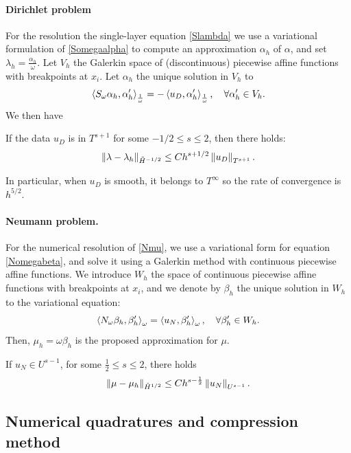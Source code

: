 \documentclass[a4paper]{article}
\begin{document}
\paragraph{Dirichlet problem} For the resolution the single-layer equation \eqref{Slambda} we use a variational formulation of \eqref{Somegaalpha} to compute an approximation $\alpha_h$ of $\alpha$, and set $\lambda_h = \frac{\alpha_h}{\omega}$. Let $V_h$ the Galerkin space of (discontinuous) piecewise affine functions with breakpoints at $x_i$. Let $\alpha_h$ the unique solution in $V_h$ to
\[ \left\langle S_\omega \alpha_h,\alpha_h'\right\rangle_\frac{1}{\omega} = -\left\langle u_D,\alpha_h'\right\rangle_\frac{1}{\omega}, \quad \forall \alpha_h' \in V_h.\]
We then have
\begin{The}
	If the data $u_D$ is in $T^{s+1}$ for some $-1/2 \leq s \leq 2$, then there holds:
	\[ \left\|\lambda - \lambda_h\right\|_{\tilde{H}^{-1/2}} \leq C h^{s+1/2} \left\|u_D\right\|_{T^{s+1}}.\]
	\label{theOrdreCVDirichlet}
\end{The}
In particular, when $u_D$ is smooth, it belongs to $T^{\infty}$ so the rate of convergence is $h^{5/2}$.

\paragraph{Neumann problem.} For the numerical resolution of \eqref{Nmu}, we use a variational form for equation \eqref{Nomegabeta}, and solve it using a Galerkin method with continuous piecewise affine functions. We introduce $W_h$ the space of continuous piecewise affine functions with breakpoints at $x_i$, and we denote by $\beta_h$ the unique solution in $W_h$ to the variational equation:
\begin{equation}
\left\langle N_\omega \beta_h,\beta_h'\right\rangle_{\omega} = \left\langle u_N,\beta_h'\right\rangle_{\omega}, \quad \forall \beta_h' \in W_h.
\label{NomegaBetaGalerk}
\end{equation}
Then, $\mu_h = \omega \beta_h$ is the proposed approximation for $\mu$. 
\begin{The}
	If $u_N \in U^{s-1}$, for some $\frac{1}{2} \leq s \leq 2$, there holds 
	\[\left\|\mu - \mu_h\right\|_{\tilde{H}^{1/2}} \leq C h^{s - \frac{1}{2}}\left\|u_N\right\|_{U^{s-1}}.\]
	\label{theOrdreCVNeumann}
\end{The}

\subsection{Numerical quadratures and compression method}
\end{document}
